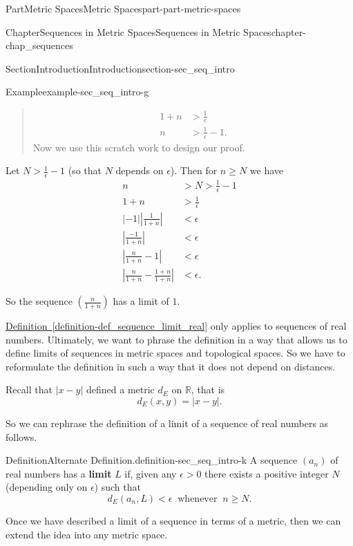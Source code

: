 \documentclass[oneside,10pt,]{book}
\newcommand{\xreffont}{\relax}
\newcommand{\terminology}[1]{\textbf{#1}}
\numberwithin{equation}{chapter}
\newcommand{\R}{\mathbb{R}}
\newcommand{\lt}{<}
\newcommand{\gt}{>}
\newcommand{\amp}{&}
\begin{document}
\begin{partptx}{Part}{Metric Spaces}{}{Metric Spaces}{}{}{part-part-metric-spaces}
\begin{chapterptx}{Chapter}{Sequences in Metric Spaces}{}{Sequences in Metric Spaces}{}{}{chapter-chap_sequences}
\begin{sectionptx}{Section}{Introduction}{}{Introduction}{}{}{section-sec_seq_intro}
\begin{example}{Example}{}{example-sec_seq_intro-g}
\begin{quote}
\begin{align*}
1+n \amp \gt \frac{1}{\epsilon}\\
n \amp \gt \frac{1}{\epsilon} -1\text{.}
\end{align*}
Now we use this scratch work to design our proof.%
\end{quote}
Let \(N \gt \frac{1}{\epsilon} -1\) (so that \(N\) depends on \(\epsilon\)). Then for \(n \geq N\) we have%
\begin{align*}
n \amp \gt N \gt \frac{1}{\epsilon} -1\\
1+n \amp \gt \frac{1}{\epsilon}\\
|-1| \left| \frac{1}{1+n} \right| \amp \lt  \epsilon\\
\left| \frac{-1}{1+n} \right| \amp \lt  \epsilon\\
\left| \frac{n}{1+n} - 1 \right| \amp \lt  \epsilon\\
\left| \frac{n}{1+n} - \frac{1+n}{1+n}  \right| \amp \lt  \epsilon\text{.}
\end{align*}
%
\par
So the sequence \(\left(\frac{n}{1+n}\right)\) has a limit of \(1\).%
\end{example}
\hyperref[definition-def_sequence_limit_real]{Definition~{\xreffont\ref{definition-def_sequence_limit_real}}} only applies to sequences of real numbers. Ultimately, we want to phrase the definition in a way that allows us to define limits of sequences in metric spaces and topological spaces. So we have to reformulate the definition in such a way that it does not depend on distances.%
\par
Recall that \(| x-y |\) defined a metric \(d_E\) on \(\R\), that is%
\begin{equation*}
d_E(x,y) = | x-y |\text{.}
\end{equation*}
%
\par
So we can rephrase the definition of a limit of a sequence of real numbers as follows.%
\begin{definition}{Definition}{Alternate Definition.}{definition-sec_seq_intro-k}%
A sequence \((a_n)\) of real numbers has a \terminology{limit} \(L\) if, given any \(\epsilon \gt 0\) there exists a positive integer \(N\) (depending only on \(\epsilon\)) such that%
\begin{equation*}
d_E(a_n, L) \lt  \epsilon \ \text{ whenever }  \ n \geq N\text{.}
\end{equation*}
%
\end{definition}
Once we have described a limit of a sequence in terms of a metric, then we can extend the idea into any metric space.%

\end{sectionptx}
\end{chapterptx}
\end{partptx}
\end{document}
